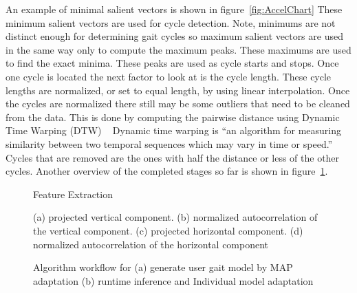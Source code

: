 \documentclass{sig-alternate}
\begin{document}
An example of minimal salient vectors is shown in figure~\ref{fig:AccelChart} These minimum salient vectors are used for cycle detection. Note, minimums are not distinct enough for determining gait cycles so maximum salient vectors are used in the same way only to compute the maximum peaks. These maximums are used to find the exact minima. These peaks are used as cycle starts and stops. Once one cycle is located the next factor to look at is the cycle length. These cycle lengths are normalized, or set to equal length, by using linear interpolation. Once the cycles are normalized there still may be some outliers that need to be cleaned from the data. This is done by computing the pairwise distance using Dynamic Time Warping (DTW) ~\cite{Muaaz:2013} Dynamic time warping is ``an algorithm for measuring similarity between two temporal sequences which may vary in time or speed.''~\cite{wiki2:2014} Cycles that are removed are the ones with half the distance or less of the other cycles. Another overview of the completed stages so far is shown in figure~\ref{fig:SecondStep}.
\begin{figure*}
\centering
{}
\caption{Minimum Salient Vectors}
\label{fig:AccelChart}
\end{figure*}

\begin{figure}
\centering
{}
\caption{Feature Extraction}
\label{fig:SecondStep}
\end{figure}

\begin{figure}
\centering
{}
\caption{(a) projected vertical component. (b) normalized autocorrelation of the vertical component. (c) projected horizontal component. (d) normalized autocorrelation of the horizontal component}
\label{fig:TD1}
\end{figure}

\begin{figure}
\centering
{}
\caption{Algorithm workflow for (a) generate user gait model by MAP adaptation (b) runtime inference and Individual model adaptation}
\label{fig:TD2}
\end{figure}
\end{document}
